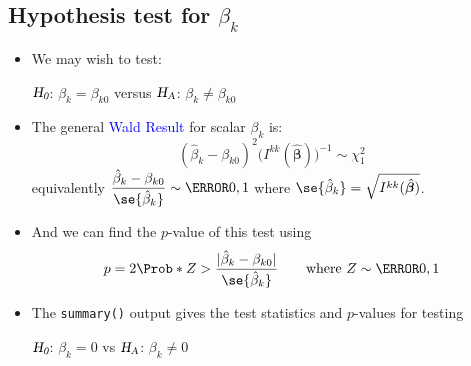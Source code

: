 \documentclass[oneside]{book}\usepackage[]{graphicx}\usepackage[svgnames]{xcolor}
\newcommand{\HN}{\textsl{H}_{\textsl{0}}}%
\newcommand{\HA}{\textsl{H}_{\textsl{A}}}%
\DeclarePairedDelimiter\abs{\lvert}{\rvert}
\providecommand{\Vector}[1]{\bm{#1}}%
\begin{document}
\subsection*{Hypothesis test for $ \beta_k $}
\begin{itemize}
      \item We may wish to test:
            \begin{center}
                  $ \HN $: $ \beta_k=\beta_{k0} $ versus $ \HA $: $ \beta_k\ne \beta_{k0} $
            \end{center}
      \item The general \textcolor{Blue}{Wald Result} for scalar $ \beta_k $ is:
            \[ (\hat{\beta}_k-\beta_{k0})^2\bigl(I^{kk}(\hat{\Vector{\beta}})\bigr)^{-1} \sim \chi^2_1 \]
            equivalently $ \displaystyle \frac{\hat{\beta}_k-\beta_{k0}}{\se{\hat{\beta}_k}}\sim \N{0,1} $ where $ \se{\hat{\beta}_k}=\sqrt{I^{kk}(\hat{\Vector{\beta}})} $.
      \item And we can find the $ p $-value of this test using
            \[ p=2\Prob*{Z>\frac{\abs{\hat{\beta}_k-\beta_{k0}}}{\se{\hat{\beta}_k}}}\qquad\text{where $ Z \sim \N{0,1} $} \]
      \item The \texttt{summary()} output gives the test statistics and $p$-values for testing
            \begin{center}
                  \begin{center}
                        $ \HN $: $ \beta_k=0 $ vs $ \HA $: $ \beta_k\ne 0 $
                  \end{center}
            \end{center}
\end{itemize}
\end{document}
